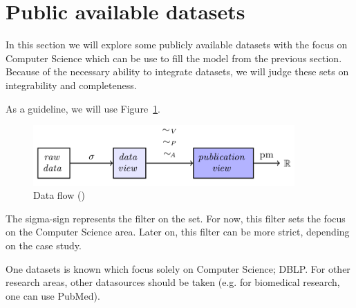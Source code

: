 \documentclass{ou-report}
\begin{document}

\section{Public available datasets}
In this section we will explore some publicly available datasets with the focus 
on Computer Science which can be use to fill the model from the previous 
section. Because of the necessary ability to integrate datasets, we
will judge these sets on integrability and completeness.

As a guideline, we will use Figure~\ref{fig:dataflow_jm2017_2}.
\begin{figure}[H]
    \centering
    \includegraphics[width=10cm]{images/data_to_publication_metrics_jm2017.png}
    \caption{Data flow (\cite{JM2017})}
    \label{fig:dataflow_jm2017_2}
\end{figure}

The sigma-sign represents the filter on the set. For now, this filter sets the 
focus on the Computer Science area. Later on, this filter can be more 
strict, depending on the case study.

One datasets is known which focus solely on Computer Science; DBLP.
For other research areas, other datasources should be taken (e.g. for biomedical 
research, one can use PubMed).
\end{document}
